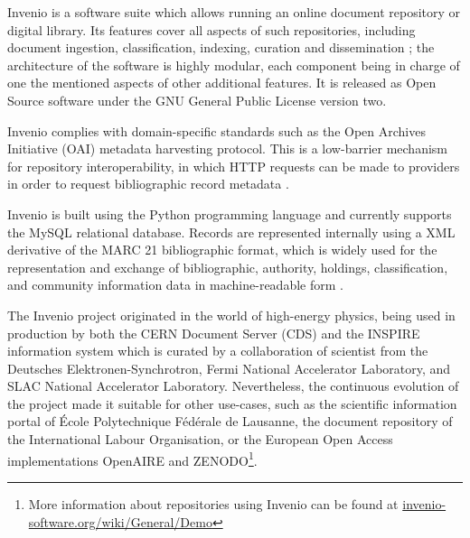 
Invenio is a software suite which allows running an online document repository
or digital library. Its features cover all aspects of such repositories,
including document ingestion, classification, indexing, curation and
dissemination \cite{ref:invenio}; the architecture of the software is highly
modular, each component being in charge of one the mentioned aspects of other
additional features. It is released as Open Source software under the GNU
General Public License version two.

Invenio complies with domain-specific standards such as the Open Archives
Initiative (OAI) metadata harvesting protocol. This is a low-barrier mechanism for
repository interoperability, in which HTTP requests can be made to providers in
order to request bibliographic record metadata \cite{ref:oai}.

Invenio is built using the Python programming language and currently supports
the MySQL relational database. Records are represented internally using a XML
derivative of the MARC 21 bibliographic format, which is widely used for the
representation and exchange of bibliographic, authority, holdings,
classification, and community information data in machine-readable form
\cite{ref:marc}.

The Invenio project originated in the world of high-energy physics, being used
in production by both the CERN Document Server (CDS) and the INSPIRE
information system which is curated by a collaboration of scientist from the
Deutsches Elektronen-Synchrotron, Fermi National Accelerator Laboratory, and
SLAC National Accelerator Laboratory. Nevertheless, the continuous evolution of
the project made it suitable for other use-cases, such as the scientific
information portal of \'{E}cole Polytechnique F\'{e}d\'{e}rale de Lausanne, the
document repository of the International Labour Organisation, or the European
Open Access implementations OpenAIRE and ZENODO\footnote{More information about
repositories using Invenio can be found at
\url{invenio-software.org/wiki/General/Demo}}.
